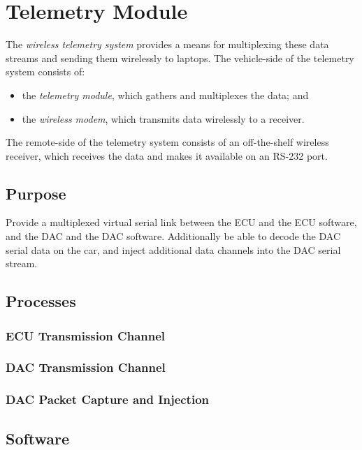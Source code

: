 \section{Telemetry Module\label{sec:Telemetry-Module-Design}}

The \emph{wireless telemetry system} provides a means for multiplexing these data streams and sending them wirelessly to laptops. The vehicle-side of the telemetry system consists of:

\begin{itemize}
\item the \emph{telemetry module}, which gathers and multiplexes the data; and
\item the \emph{wireless modem}, which transmits data wirelessly to a receiver.
\end{itemize}

The remote-side of the telemetry system consists of an off-the-shelf wireless receiver, which receives the data and makes it available on an RS-232 port.


\subsection{Purpose}

Provide a multiplexed virtual serial link between the ECU and the ECU software, and the DAC and the DAC software. Additionally be able to decode the DAC serial data on the car, and inject additional data channels into the DAC serial stream.


\subsection{Processes}


\subsubsection{ECU Transmission Channel}


\subsubsection{DAC Transmission Channel}


\subsubsection{DAC Packet Capture and Injection}


\subsection{Software}


